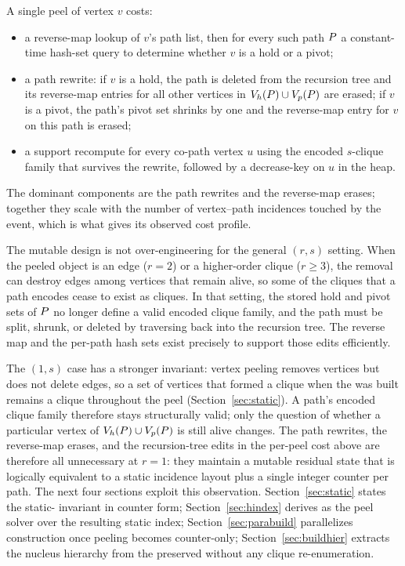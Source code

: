 A single peel of vertex $v$ costs:
\begin{itemize}[leftmargin=1.5em,itemsep=1pt,topsep=2pt]
\item a reverse-map lookup of $v$'s path list, then for every such path $\TPath$ a constant-time hash-set query to determine whether $v$ is a hold or a pivot;
\item a path rewrite: if $v$ is a hold, the path is deleted from the recursion tree and its reverse-map entries for all other vertices in $\Vh(\TPath)\cup\Vp(\TPath)$ are erased; if $v$ is a pivot, the path's pivot set shrinks by one and the reverse-map entry for $v$ on this path is erased;
\item a support recompute for every co-path vertex $u$ using the encoded $s$-clique family that survives the rewrite, followed by a decrease-key on $u$ in the heap.
\end{itemize}
The dominant components are the path rewrites and the reverse-map erases; together they scale with the number of vertex--path incidences touched by the event, which is what gives \cbnd{} its observed cost profile.

The mutable design is not over-engineering for the general $(r,s)$ setting.
%
When the peeled object is an edge ($r{=}2$) or a higher-order clique ($r\!\ge\!3$), the removal can destroy edges among vertices that remain alive, so some of the cliques that a path encodes cease to exist as cliques.
%
In that setting, the stored hold and pivot sets of $\TPath$ no longer define a valid encoded clique family, and the path must be split, shrunk, or deleted by traversing back into the recursion tree.
%
The reverse map and the per-path hash sets exist precisely to support those edits efficiently.

The $(1,s)$ case has a stronger invariant: vertex peeling removes vertices but does not delete edges, so a set of vertices that formed a clique when the \cpi{} was built remains a clique throughout the peel (Section~\ref{sec:static}).
%
A path's encoded clique family therefore stays structurally valid; only the question of whether a particular vertex of $\Vh(\TPath)\cup\Vp(\TPath)$ is still alive changes.
%
The path rewrites, the reverse-map erases, and the recursion-tree edits in the per-peel cost above are therefore all unnecessary at $r{=}1$: they maintain a mutable residual state that is logically equivalent to a static incidence layout plus a single integer counter per path.
%
The next four sections exploit this observation. Section~\ref{sec:static} states the static-\cpi{} invariant in counter form; Section~\ref{sec:hindex} derives \spinStar{} as the peel solver over the resulting static index; Section~\ref{sec:parabuild} parallelizes construction once peeling becomes counter-only; Section~\ref{sec:buildhier} extracts the nucleus hierarchy from the preserved \cpi{} without any clique re-enumeration.
